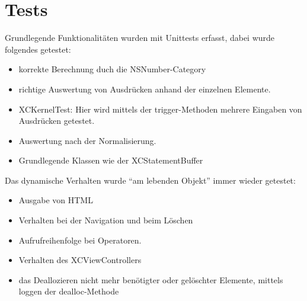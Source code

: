 \chapter{Tests}
Grundlegende Funktionalitäten wurden mit Unittests erfasst, dabei wurde folgendes getestet:
\begin{itemize}
	\item korrekte Berechnung duch die NSNumber-Category
	\item richtige Auswertung von Ausdrücken anhand der einzelnen Elemente.
	\item XCKernelTest: Hier wird mittels der trigger-Methoden mehrere Eingaben von Ausdrücken getestet.
	\item Auswertung nach der Normalisierung.
	\item Grundlegende Klassen wie der XCStatementBuffer
\end{itemize}
Das dynamische Verhalten wurde ``am lebenden Objekt'' immer wieder getestet:
\begin{itemize}
	\item Ausgabe von HTML
	\item Verhalten bei der Navigation und beim Löschen
	\item Aufrufreihenfolge bei Operatoren.
	\item Verhalten des XCViewControllers
	\item das Deallozieren nicht mehr benötigter oder gelöschter Elemente, mittels loggen der dealloc-Methode
\end{itemize}
